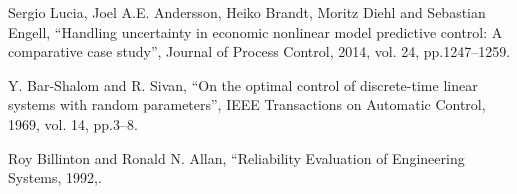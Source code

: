 \documentclass[conference]{IEEEtran}
\begin{document}
\begin{thebibliography}{00}
 Sergio Lucia, Joel A.E. Andersson, Heiko Brandt, Moritz Diehl and Sebastian Engell, ``Handling uncertainty in economic nonlinear model predictive control: A comparative case study'', Journal of Process Control, 2014, vol. 24, pp.1247--1259.

 Y. {Bar-Shalom} and R. {Sivan}, ``On the optimal control of discrete-time linear systems with random parameters'', IEEE Transactions on Automatic Control, 1969, vol. 14, pp.3--8.

 Roy Billinton and Ronald N. Allan, ``Reliability Evaluation of Engineering Systems, 1992,.

\end{thebibliography}
\end{document}
